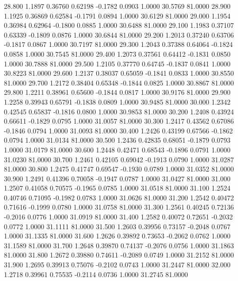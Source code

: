   28.800   1.1897   0.36760   0.62198  -0.1782   0.0903   1.0000  30.5769  81.0000
  28.900   1.1925   0.36869   0.62584  -0.1791   0.0894   1.0000  30.6129  81.0000
  29.000   1.1954   0.36984   0.62964  -0.1800   0.0885   1.0000  30.6488  81.0000
  29.100   1.1983   0.37107   0.63339  -0.1809   0.0876   1.0000  30.6844  81.0000
  29.200   1.2013   0.37240   0.63706  -0.1817   0.0867   1.0000  30.7197  81.0000
  29.300   1.2043   0.37388   0.64064  -0.1824   0.0858   1.0000  30.7545  81.0000
  29.400   1.2073   0.37561   0.64412  -0.1831   0.0850   1.0000  30.7888  81.0000
  29.500   1.2105   0.37770   0.64745  -0.1837   0.0841   1.0000  30.8223  81.0000
  29.600   1.2137   0.38037   0.65059  -0.1841   0.0833   1.0000  30.8550  81.0000
  29.700   1.2172   0.38404   0.65348  -0.1844   0.0825   1.0000  30.8867  81.0000
  29.800   1.2211   0.38961   0.65600  -0.1844   0.0817   1.0000  30.9176  81.0000
  29.900   1.2258   0.39943   0.65791  -0.1838   0.0809   1.0000  30.9485  81.0000
  30.000   1.2342   0.42545   0.65837  -0.1816   0.0800   1.0000  30.9853  81.0000
  30.200   1.2408   0.43924   0.66611  -0.1829   0.0795   1.0000  31.0057  81.0000
  30.300   1.2417   0.43562   0.67086  -0.1846   0.0794   1.0000  31.0093  81.0000
  30.400   1.2426   0.43199   0.67566  -0.1862   0.0794   1.0000  31.0134  81.0000
  30.500   1.2436   0.42835   0.68051  -0.1879   0.0793   1.0000  31.0179  81.0000
  30.600   1.2448   0.42471   0.68543  -0.1896   0.0791   1.0000  31.0230  81.0000
  30.700   1.2461   0.42105   0.69042  -0.1913   0.0790   1.0000  31.0287  81.0000
  30.800   1.2475   0.41747   0.69547  -0.1930   0.0789   1.0000  31.0352  81.0000
  30.900   1.2491   0.41396   0.70058  -0.1947   0.0787   1.0000  31.0427  81.0000
  31.000   1.2507   0.41058   0.70575  -0.1965   0.0785   1.0000  31.0518  81.0000
  31.100   1.2524   0.40746   0.71095  -0.1982   0.0783   1.0000  31.0626  81.0000
  31.200   1.2542   0.40472   0.71616  -0.1999   0.0780   1.0000  31.0758  81.0000
  31.300   1.2561   0.40245   0.72136  -0.2016   0.0776   1.0000  31.0919  81.0000
  31.400   1.2582   0.40072   0.72651  -0.2032   0.0772   1.0000  31.1111  81.0000
  31.500   1.2603   0.39956   0.73157  -0.2048   0.0767   1.0000  31.1335  81.0000
  31.600   1.2626   0.39892   0.73653  -0.2062   0.0762   1.0000  31.1589  81.0000
  31.700   1.2648   0.39870   0.74137  -0.2076   0.0756   1.0000  31.1863  81.0000
  31.800   1.2672   0.39880   0.74611  -0.2089   0.0749   1.0000  31.2152  81.0000
  31.900   1.2695   0.39913   0.75076  -0.2102   0.0743   1.0000  31.2447  81.0000
  32.000   1.2718   0.39961   0.75535  -0.2114   0.0736   1.0000  31.2745  81.0000
